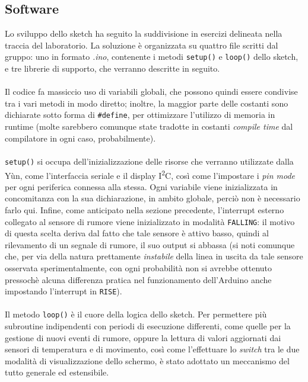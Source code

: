 \documentclass[12pt,a4paper]{article}
\begin{document}
\subsection{Software}

Lo sviluppo dello sketch ha seguito la suddivisione in esercizi delineata nella traccia del laboratorio. La soluzione è organizzata su quattro file scritti dal gruppo: uno in formato \textit{.ino}, contenente i metodi \verb|setup()| e \verb|loop()| dello sketch, e tre librerie di supporto, che verranno descritte in seguito.
\\ \\
Il codice fa massiccio uso di variabili globali, che possono quindi essere condivise tra i vari metodi in modo diretto; inoltre, la maggior parte delle costanti sono dichiarate sotto forma di \verb|#define|, per ottimizzare l'utilizzo di memoria in runtime (molte sarebbero comunque state tradotte in costanti \textit{compile time} dal compilatore in ogni caso, probabilmente).
\\ \\
\verb|setup()| si occupa dell'inizializzazione delle risorse che verranno utilizzate dalla Yùn, come l'interfaccia seriale e il display I\textsuperscript{2}C, così come l'impostare i \textit{pin mode} per ogni periferica connessa alla stessa. Ogni variabile viene inizializzata in concomitanza con la sua dichiarazione, in ambito globale, perciò non è necessario farlo qui.
Infine, come anticipato nella sezione precedente, l'interrupt esterno collegato al sensore di rumore viene inizializzato in modalità \verb|FALLING|: il motivo di questa scelta deriva dal fatto che tale sensore è attivo basso, quindi al rilevamento di un segnale di rumore, il suo output si abbassa (si noti comunque che, per via della natura prettamente \textit{instabile} della linea in uscita da tale sensore osservata sperimentalmente, con ogni probabilità non si avrebbe ottenuto pressochè alcuna differenza pratica nel funzionamento dell'Arduino anche impostando l'interrupt in \verb|RISE|).
\\ \\
Il metodo \verb|loop()| è il cuore della logica dello sketch. Per permettere più subroutine indipendenti con periodi di esecuzione differenti, come quelle per la gestione di nuovi eventi di rumore, oppure la lettura di valori aggiornati dai sensori di temperatura e di movimento, così come l'effettuare lo \textit{switch} tra le due modalità di visualizzazione dello schermo, è stato adottato un meccanismo del tutto generale ed estensibile.
\end{document}
